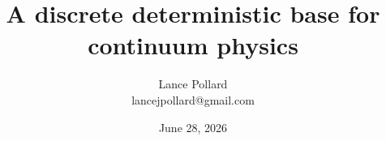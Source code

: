 \renewcommand{\thepart}{\arabic{part}}
\titleformat{\part}[hang]{\Large\bfseries}{\thepart.}{0.5em}{}
\titlespacing*{\part}{0pt}{1.2em}{0.8em}
\titleformat{\section}{\Large\bfseries}{}{0pt}{}

\onehalfspacing

\theoremheaderfont{\bfseries}
\theorembodyfont{\normalfont}
\newtheorem{axiom}{Axiom}
\newtheorem{definition}{Definition}
\newtheorem{theorem}{Theorem}
\newtheorem{principle}{Principle}
\newtheorem{result}{Result}
\newtheorem{finding}{Finding}

\makeatletter
\def\@begintheorem#1#2#3{%
  \par\addvspace{0.5em}%
  \noindent\textbf{#1 #2.}
  \ifx\@empty#3\relax
    \quad
  \else
    \ \textbf{#3:}
  \fi
  \hspace{0.5em}
}
\def\@endtheorem{\par}
\makeatother

\title{
  {\LARGE \textbf{A discrete deterministic base for continuum physics}}
}
\author{Lance Pollard \\ \small lancejpollard@gmail.com}
\date{June 28, 2026}
